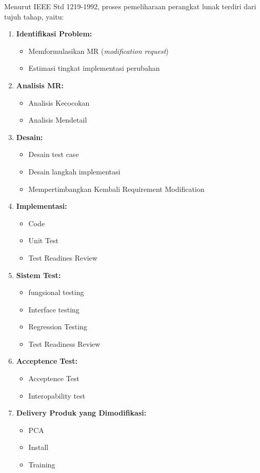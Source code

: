 \documentclass[12pt]{article}
\begin{document}
Menurut IEEE Std 1219-1992, proses pemeliharaan perangkat lunak terdiri dari tujuh tahap, yaitu:
\begin{enumerate}
  \item \textbf{Identifikasi Problem:}
  \begin{itemize}
      \item Memformulasikan MR (\emph{modification request})
      \item Estimasi tingkat implementasi perubahan
  \end{itemize}
  
  \item \textbf{Analisis MR:}
  \begin{itemize}
    \item Analisis Kecocokan
    \item Analisis Mendetail
  \end{itemize}
  
  \item \textbf{Desain:}
  \begin{itemize}
      \item Desain test case
      \item Desain langkah implementasi
      \item Mempertimbangkan Kembali Requirement Modification
  \end{itemize}
  
  \item \textbf{Implementasi:}
  \begin{itemize}
      \item Code
      \item Unit Test
      \item Test Readines Review
  \end{itemize}
  
  \item \textbf{Sistem Test:}
  \begin{itemize}
      \item fungsional testing
      \item Interface testing
      \item Regression Testing
      \item Test Readiness Review
  \end{itemize}
  
  \item \textbf{Acceptence Test:}
  \begin{itemize}
      \item Acceptence Test
      \item Interopability test
  \end{itemize}
  

  \item \textbf{Delivery Produk yang Dimodifikasi:}
  \begin{itemize}
      \item PCA
      \item Install
      \item Training
  \end{itemize}
\end{enumerate}
\end{document}
